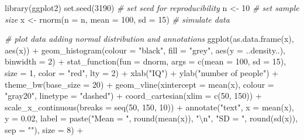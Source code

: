 \documentclass[
  oneside]{book}
\newenvironment{Shaded}{\begin{snugshade}}{\end{snugshade}}
\newcommand{\AttributeTok}[1]{\textcolor[rgb]{0.77,0.63,0.00}{#1}}
\newcommand{\CommentTok}[1]{\textcolor[rgb]{0.56,0.35,0.01}{\textit{#1}}}
\newcommand{\DecValTok}[1]{\textcolor[rgb]{0.00,0.00,0.81}{#1}}
\newcommand{\FloatTok}[1]{\textcolor[rgb]{0.00,0.00,0.81}{#1}}
\newcommand{\FunctionTok}[1]{\textcolor[rgb]{0.00,0.00,0.00}{#1}}
\newcommand{\NormalTok}[1]{#1}
\newcommand{\OtherTok}[1]{\textcolor[rgb]{0.56,0.35,0.01}{#1}}
\newcommand{\SpecialCharTok}[1]{\textcolor[rgb]{0.00,0.00,0.00}{#1}}
\newcommand{\StringTok}[1]{\textcolor[rgb]{0.31,0.60,0.02}{#1}}
\begin{document}
\begin{Shaded}
\begin{Highlighting}[]
\FunctionTok{library}\NormalTok{(ggplot2)}
\FunctionTok{set.seed}\NormalTok{(}\DecValTok{3190}\NormalTok{) }\CommentTok{\# set seed for reproducibility}
\NormalTok{n }\OtherTok{\textless{}{-}} \DecValTok{10} \CommentTok{\# set sample size}
\NormalTok{x }\OtherTok{\textless{}{-}} \FunctionTok{rnorm}\NormalTok{(}\AttributeTok{n =}\NormalTok{ n, }\AttributeTok{mean =} \DecValTok{100}\NormalTok{, }\AttributeTok{sd =} \DecValTok{15}\NormalTok{) }\CommentTok{\# simulate data}

\CommentTok{\# plot data adding normal distribution and annotations}
\FunctionTok{ggplot}\NormalTok{(}\FunctionTok{as.data.frame}\NormalTok{(x), }\FunctionTok{aes}\NormalTok{(x)) }\SpecialCharTok{+}
  \FunctionTok{geom\_histogram}\NormalTok{(}\AttributeTok{colour =} \StringTok{"black"}\NormalTok{, }\AttributeTok{fill =} \StringTok{"grey"}\NormalTok{, }\FunctionTok{aes}\NormalTok{(}\AttributeTok{y =}\NormalTok{ ..density..), }\AttributeTok{binwidth =} \DecValTok{2}\NormalTok{) }\SpecialCharTok{+}
  \FunctionTok{stat\_function}\NormalTok{(}\AttributeTok{fun =}\NormalTok{ dnorm, }\AttributeTok{args =} \FunctionTok{c}\NormalTok{(}\AttributeTok{mean =} \DecValTok{100}\NormalTok{, }\AttributeTok{sd =} \DecValTok{15}\NormalTok{), }\AttributeTok{size =} \DecValTok{1}\NormalTok{, }\AttributeTok{color =} \StringTok{"red"}\NormalTok{, }\AttributeTok{lty =} \DecValTok{2}\NormalTok{) }\SpecialCharTok{+}
  \FunctionTok{xlab}\NormalTok{(}\StringTok{"IQ"}\NormalTok{) }\SpecialCharTok{+}
  \FunctionTok{ylab}\NormalTok{(}\StringTok{"number of people"}\NormalTok{) }\SpecialCharTok{+}
  \FunctionTok{theme\_bw}\NormalTok{(}\AttributeTok{base\_size =} \DecValTok{20}\NormalTok{) }\SpecialCharTok{+}
  \FunctionTok{geom\_vline}\NormalTok{(}\AttributeTok{xintercept =} \FunctionTok{mean}\NormalTok{(x), }\AttributeTok{colour =} \StringTok{"gray20"}\NormalTok{, }\AttributeTok{linetype =} \StringTok{"dashed"}\NormalTok{) }\SpecialCharTok{+}
  \FunctionTok{coord\_cartesian}\NormalTok{(}\AttributeTok{xlim =} \FunctionTok{c}\NormalTok{(}\DecValTok{50}\NormalTok{, }\DecValTok{150}\NormalTok{)) }\SpecialCharTok{+}
  \FunctionTok{scale\_x\_continuous}\NormalTok{(}\AttributeTok{breaks =} \FunctionTok{seq}\NormalTok{(}\DecValTok{50}\NormalTok{, }\DecValTok{150}\NormalTok{, }\DecValTok{10}\NormalTok{)) }\SpecialCharTok{+}
  \FunctionTok{annotate}\NormalTok{(}\StringTok{"text"}\NormalTok{, }\AttributeTok{x =} \FunctionTok{mean}\NormalTok{(x), }\AttributeTok{y =} \FloatTok{0.02}\NormalTok{, }\AttributeTok{label =} \FunctionTok{paste}\NormalTok{(}\StringTok{"Mean = "}\NormalTok{, }\FunctionTok{round}\NormalTok{(}\FunctionTok{mean}\NormalTok{(x)), }\StringTok{"}\SpecialCharTok{\textbackslash{}n}\StringTok{"}\NormalTok{, }\StringTok{"SD = "}\NormalTok{, }\FunctionTok{round}\NormalTok{(}\FunctionTok{sd}\NormalTok{(x)), }\AttributeTok{sep =} \StringTok{""}\NormalTok{), }\AttributeTok{size =} \DecValTok{8}\NormalTok{) }\SpecialCharTok{+} 

\end{Highlighting}
\end{Shaded}
\end{document}
